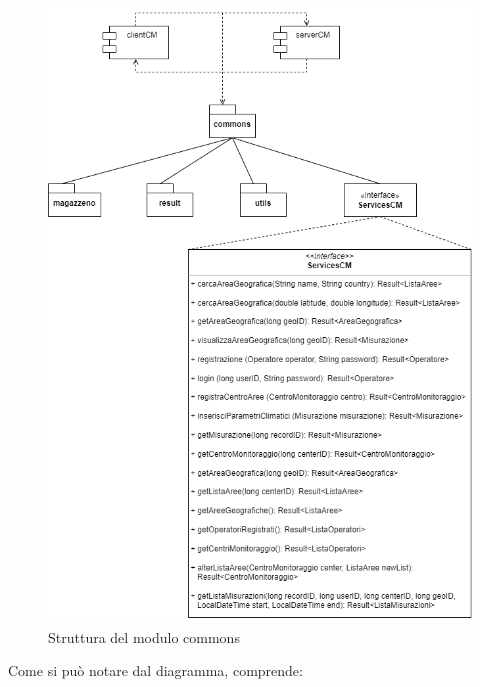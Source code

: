 \begin{figure}[h]
	\centering
	\caption{Struttura del modulo commons}
	\label{fig:commonscm}
	\includegraphics[width=0.7\linewidth]{../../fig/img/tecnico/CM.drawio}
\end{figure}
\pagebreak
Come si può notare dal diagramma, comprende:
